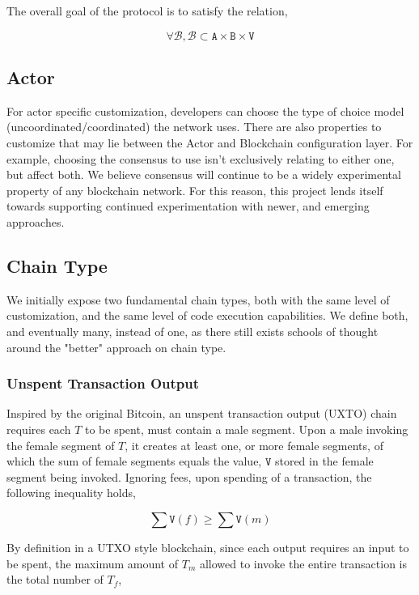 \documentclass[12pt, titlepage, twocolumn]{report}
\begin{document}
The overall goal of the protocol is to satisfy the relation,

\begin{equation}
\forall \boldsymbol{\mathcal{B}}, \boldsymbol{\mathcal{B}} \subset \texttt{A} \times \texttt{B} \times \texttt{V}
\end{equation}

\subsection{Actor}
For actor specific customization, developers can choose the type of choice model (uncoordinated/coordinated) the network uses. There are also properties to customize that may lie between the Actor and Blockchain configuration layer. For example, choosing the consensus to use isn't exclusively relating to either one, but affect both. We believe consensus will continue to be a widely experimental property of any blockchain network. For this reason, this project lends itself towards supporting continued experimentation with newer, and emerging approaches.


\subsection{Chain Type} \label{chaintypes}
We initially expose two fundamental chain types, both with the same level of customization, and the same level of code execution capabilities. We define both, and eventually many, instead of one, as there still exists schools of thought around the "better" approach on chain type.


\subsubsection{Unspent Transaction Output}
Inspired by the original Bitcoin, an unspent transaction output (UXTO) chain requires each \(T\) to be spent, must contain a male segment. Upon a male invoking the female segment of \(T\), it creates at least one, or more female segments, of which the sum of female segments equals the value, \(\boldsymbol{\texttt{V}}\) stored in the female segment being invoked. Ignoring fees, upon spending of a transaction, the following inequality holds,

\begin{equation}
	 \sum \boldsymbol{\texttt{V}}(f) \geq \sum \boldsymbol{\texttt{V}}(m)
\end{equation} 

By definition in a UTXO style blockchain, since each output requires an input to be spent, the maximum amount of \(T_m\) allowed to invoke the entire transaction is the total number of \(T_f\), 
\end{document}
